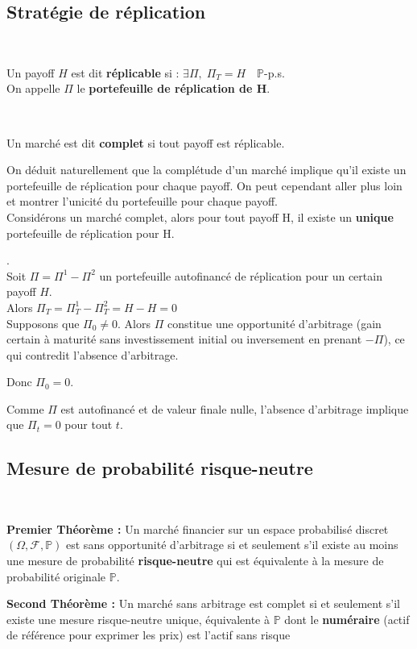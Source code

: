 \subsection{Stratégie de réplication}
~\
\begin{definitionbox}[frametitle = {Réplication}]
    Un payoff $H$ est dit \textbf{réplicable} si : $\exists \Pi, \; \Pi_T=H \quad \mathbb{P}$-p.s. \\
    On appelle $\Pi$ le \textbf{portefeuille de réplication de H}.
\end{definitionbox}
~\
\begin{definitionbox}[frametitle = {Complétude de marché}]
    Un marché est dit \textbf{complet} si tout payoff est réplicable.
\end{definitionbox}
\remark On déduit naturellement que la complétude d'un marché implique qu'il existe un portefeuille de réplication pour chaque payoff. On peut cependant aller plus loin et montrer l'unicité du portefeuille pour chaque payoff. \\

Considérons un marché complet, alors pour tout payoff H, il existe un \textbf{unique} portefeuille de réplication pour H.

\proofname{}.\\
Soit $\Pi = \Pi^1-\Pi^2$ un portefeuille autofinancé de réplication pour un certain payoff $H$. \\
Alors $\Pi_T=\Pi^1_T-\Pi^2_T=H-H=0$ \\
Supposons que $\Pi_0 \neq 0$.  
Alors $\Pi$ constitue une opportunité d'arbitrage (gain certain à maturité sans investissement initial ou inversement en prenant $-\Pi$), ce qui contredit l'absence d'arbitrage.

Donc $\Pi_0 = 0$.

Comme $\Pi$ est autofinancé et de valeur finale nulle, l'absence d'arbitrage implique que $\Pi_t = 0$ pour tout $t$.
\pagebreak
\subsection{Mesure de probabilité risque-neutre}
~\
\begin{definitionbox}[frametitle = {Théorèmes Fondamentaux de l'évaluation d'actifs}]
    \textbf{Premier Théorème : } Un marché financier sur un espace probabilisé discret $(\Omega,\mathcal{F},\mathbb{P})$ est sans opportunité d'arbitrage si et seulement s'il existe au moins une mesure de probabilité \textbf{risque-neutre} qui est équivalente à la mesure de probabilité originale $\mathbb{P}$.

    \textbf{Second Théorème : } Un marché sans arbitrage est complet si et seulement s'il existe une mesure risque-neutre unique, équivalente à $\mathbb{P}$ dont le \textbf{numéraire} (actif de référence pour exprimer les prix) est l'actif sans risque
\end{definitionbox}
\vspace{0.025\textheight}

